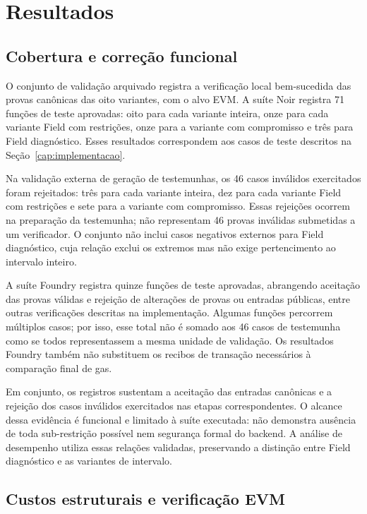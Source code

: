 \chapter{Resultados}
\label{cap:resultados}

\section{Cobertura e correção funcional}

O conjunto de validação arquivado registra a verificação local bem-sucedida das provas canônicas das oito variantes, com o alvo EVM. A suíte Noir registra 71 funções de teste aprovadas: oito para cada variante inteira, onze para cada variante Field com restrições, onze para a variante com compromisso e três para Field diagnóstico. Esses resultados correspondem aos casos de teste descritos na Seção~\ref{cap:implementacao}.

Na validação externa de geração de testemunhas, os 46 casos inválidos exercitados foram rejeitados: três para cada variante inteira, dez para cada variante Field com restrições e sete para a variante com compromisso. Essas rejeições ocorrem na preparação da testemunha; não representam 46 provas inválidas submetidas a um verificador. O conjunto não inclui casos negativos externos para Field diagnóstico, cuja relação exclui os extremos mas não exige pertencimento ao intervalo inteiro.

A suíte Foundry registra quinze funções de teste aprovadas, abrangendo aceitação das provas válidas e rejeição de alterações de provas ou entradas públicas, entre outras verificações descritas na implementação. Algumas funções percorrem múltiplos casos; por isso, esse total não é somado aos 46 casos de testemunha como se todos representassem a mesma unidade de validação. Os resultados Foundry também não substituem os recibos de transação necessários à comparação final de gas.

Em conjunto, os registros sustentam a aceitação das entradas canônicas e a rejeição dos casos inválidos exercitados nas etapas correspondentes. O alcance dessa evidência é funcional e limitado à suíte executada: não demonstra ausência de toda sub-restrição possível nem segurança formal do backend. A análise de desempenho utiliza essas relações validadas, preservando a distinção entre Field diagnóstico e as variantes de intervalo.

\section{Custos estruturais e verificação EVM}

